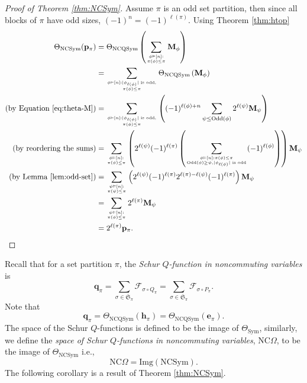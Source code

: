 \documentclass[11pt]{amsart}
\numberwithin{equation}{section}
\newcommand{\NCQSym}{\mathrm{NCQSym}}
\newcommand{\NCSym}{\mathrm{NCSym}}
\newcommand{\Sym}{\mathrm{Sym}}
\newcommand{\odd}{\mathrm{Odd}}
\newcommand{\NCGamma}{\mathrm{NC}\Omega}
\newcommand{\scrF}{{\mathscr{F}}}
\newcommand{\frakS}{{\mathfrak{S}}}
\newcommand{\bfM}{{\mathbf{M}}}
\begin{document}
\begin{proof}[Proof of Theorem \ref{thm:NCSym}]
	
	Assume $\pi$ is an odd set partition, then since all blocks of $\pi$ have odd sizes, $(-1)^n=(-1)^{\ell(\pi)}$. Using Theorem \ref{thm:htop}
	\begin{align*}
	\Theta_{\NCSym}(\mathbf{p}_\pi)&=\Theta_{\NCQSym}\left(\sum_{\phi\vDash [n]:\atop  \pi(\phi)\leq \pi}\mathbf{M}_{\phi} \right)\\
	&=\sum_{\phi\vDash [n]:|\phi_{\ell(\phi)}| \text{~is odd,}\atop  \pi(\phi)\leq \pi}\Theta_{\NCQSym}\left(\mathbf{M}_{\phi}\right)\\
	(\text{by Equation \ref{eq:theta-M}})&=\sum_{\phi\vDash [n]:|\phi_{\ell(\phi)}| \text{~is odd,}\atop  \pi(\phi)\leq \pi} \left((-1)^{\ell(\phi)+n}\displaystyle\sum_{\psi\leq \odd(\phi)}2^{\ell(\psi)}\mathbf{M}_{\psi}\right)\\
	(\text{by reordering the sums})&=\sum_{\phi\vDash[n]:\atop \pi(\phi)\leq \pi} \left( 
	2^{\ell(\psi)}(-1)^{\ell(\pi)} \left( 
	\sum_{\phi\vDash [n]: \pi(\phi)\leq \pi \atop \odd(\phi)\geq \psi, |\phi_{\ell(\phi)}|\text{~is odd}} (-1)^{\ell(\phi)}
	\right) 
	\right)\bfM_{\psi}\\
	(\text{by Lemma \ref{lem:odd-set}})&=\sum_{\psi\vDash[n]:\atop \pi(\psi)\leq \pi} \left( 
	2^{\ell(\psi)}(-1)^{\ell(\pi)} 2^{\ell(\pi)-\ell(\psi)}(-1)^{\ell(\pi)}
	\right)\bfM_{\psi}\\
	&=\sum_{\psi\vDash[n]:\atop \pi(\phi)\leq \pi} 2^{\ell(\pi)} \bfM_{\psi}\\
	&=2^{\ell(\pi)}\mathbf{p}_\pi.
	\end{align*}

\end{proof}




Recall that for a set partition $\pi$, the \emph{Schur $Q$-function in noncommuting variables} is 
$$\mathbf{q}_\pi=\sum_{\sigma\in \frakS_{\pi}} \scrF_{\sigma\circ Q_{\pi}}=\sum_{\sigma\in \frakS_{\pi}} \scrF_{\sigma\circ P_{\pi}}.$$
Note that  $$\mathbf{q}_\pi=\Theta_{\NCQSym}(\mathbf{h}_\pi)=\Theta_{\NCQSym}(\mathbf{e}_\pi).$$ 
The space of the Schur $Q$-functions is defined to be the image of $\Theta_\Sym$, similarly, we define the \emph{space of Schur $Q$-functions in noncommuting variables}, $\NCGamma$, to be the image of $\Theta_{\NCSym}$ i.e., 
	$$\NCGamma=\mathrm{Img}(\NCSym).$$
	The following corollary is a result of Theorem \ref{thm:NCSym}.
\end{document}
